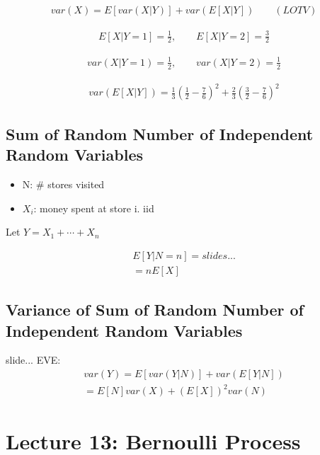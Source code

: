 \documentclass{article}
\begin{document}
\begin{align*}
var(X) = E[var(X|Y)] + var(E[X|Y]) \qquad (LOTV)
\end{align*}

\begin{align*}
E[X|Y=1] = \frac{1}{2}, \qquad E[X|Y=2] = \frac{3}{2}
\end{align*}

\begin{align*}
var(X|Y=1) = \frac{1}{2}, \qquad var(X|Y=2) = \frac{1}{2}
\end{align*}

\begin{align*}
var(E[X|Y]) = \frac{1}{3} \left(\frac{1}{2} - \frac{7}{6} \right)^2 + \frac{2}{3} \left( \frac{3}{2} - \frac{7}{6} \right)^2
\end{align*}

\subsection{Sum of Random Number of Independent Random Variables}


\begin{itemize}
    \item N: \# stores visited
    \item $X_i$: money spent at store i. iid
\end{itemize}


Let $Y=X_1+ \cdots + X_n$

\begin{align*}
    E[Y|N=n] = slides...\\
    = nE[X]
\end{align*}

\subsection{Variance of Sum of Random Number of Independent Random Variables}


slide...
EVE:
\begin{align*}
var(Y) = E[var(Y|N)] + var(E[Y|N])\\
 = E[N] var(X) + (E[X])^2 var(N)
\end{align*}

\section{Lecture 13: Bernoulli Process}
\end{document}

